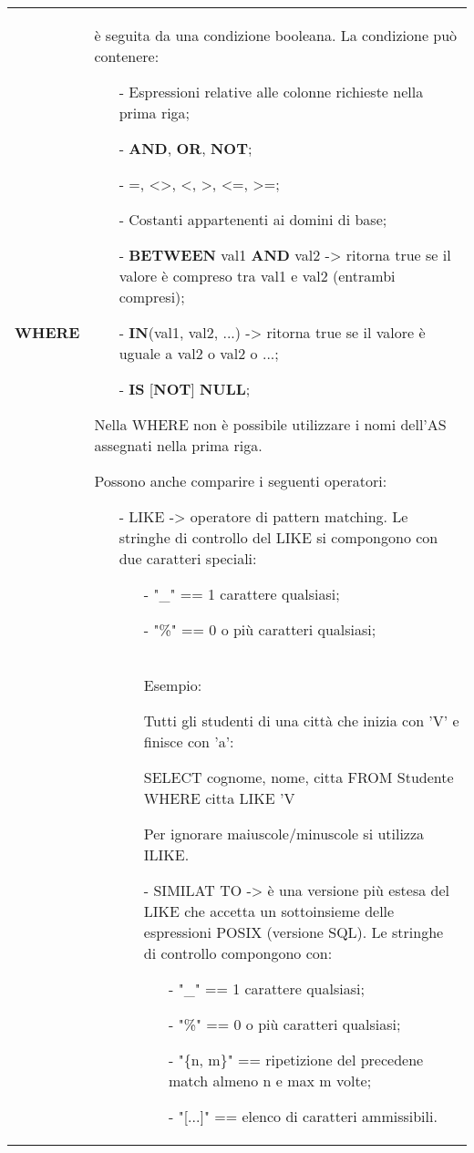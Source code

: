 \documentclass[a4paper, 10pt]{report}
\begin{document}
\begin{longtable}{ p{}  p{}}
\textbf{WHERE} & è seguita da una condizione booleana. La condizione può contenere:
\begin{itemize}
\item[-] Espressioni relative alle colonne richieste nella prima riga;
\item[-] \textbf{AND}, \textbf{OR}, \textbf{NOT};
\item[-] =, <>, <, >, <=, >=;
\item[-] Costanti appartenenti ai domini di base;
\item[-] \textbf{BETWEEN} val1 \textbf{AND} val2 -> ritorna true se il valore è compreso tra val1 e val2 (entrambi compresi);
\item[-] \textbf{IN}(val1, val2, ...) -> ritorna true se il valore è uguale a val2 o val2 o ...;
\item[-] \textbf{IS} [\textbf{NOT}] \textbf{NULL};
\end{itemize}  
\noindent Nella WHERE non è possibile utilizzare i nomi dell'AS assegnati nella prima riga.

\noindent Possono anche comparire i seguenti operatori:
\begin{itemize}
\item[-] LIKE -> operatore di pattern matching. Le stringhe di controllo del LIKE si compongono con due caratteri speciali:
	\begin{itemize}
	\item[-] "\_" == 1 carattere qualsiasi;
	\item[-] "\%" == 0 o più caratteri qualsiasi;
	\end{itemize}
\end{itemize}
\\
 &	\begin{itemize}
 \item[]
\begin{itemize}
 \item[]
 Esempio:
	
	\noindent Tutti gli studenti di una città che inizia con 'V' e finisce con 'a':
	\begin{code}
	SELECT cognome, nome, citta FROM Studente 
	WHERE citta LIKE 'V%
	\end{code}
	
\noindent Per ignorare maiuscole/minuscole si utilizza ILIKE.

\item[-] SIMILAT TO -> è una versione più estesa del LIKE che accetta un sottoinsieme delle espressioni POSIX (versione SQL). Le stringhe di controllo compongono con:
	\begin{itemize}
	\item[-] "\_" == 1 carattere qualsiasi;
	\item[-] "\%" == 0 o più caratteri qualsiasi;
	\item[-] "\{n, m\}" == ripetizione del precedene match almeno n e max m volte;
	\item[-] "[...]" == elenco di caratteri ammissibili.
	\end{itemize}


\end{itemize}
\end{itemize}
\end{longtable}
\end{document}
